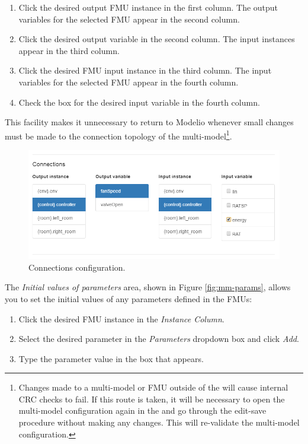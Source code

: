 \begin{enumerate}
  \item Click the desired output FMU instance in the first column.  The output variables for the selected FMU appear in the second column.
  \item Click the desired output variable in the second column.  The input instances appear in the third column.
  \item Click the desired FMU input instance in the third column.  The input variables for the selected FMU appear in the fourth column.
  \item Check the box for the desired input variable in the fourth column.
\end{enumerate}
%
%
%
This facility makes it unnecessary to return to Modelio whenever small changes must be made to the connection topology of the multi-model\footnote{Changes made to a multi-model or FMU outside of the \intoapp{} will cause internal CRC checks to fail.  If this route is taken, it will be necessary to open the multi-model configuration again in the \intoapp{} and go through the edit-save procedure without making any changes.  This will re-validate the multi-model configuration.}.
%
%
%
\begin{figure}[h!]
\centering
\includegraphics[width=\textwidth]{./figures/app/mm-conns}
\caption{Connections configuration.}
\label{fig:mm-conns}
\end{figure}
%
%
%
The \textit{Initial values of parameters} area, shown in
Figure \ref{fig:mm-params}, allows you to set the initial values of any parameters
defined in the FMUs:
%
%
%
\begin{enumerate}
  \item Click the desired FMU instance in the \textit{Instance Column}.
  \item Select the desired parameter in the \textit{Parameters} dropdown box and click \textit{Add}.
      \item Type the parameter value in the box that appears.
\end{enumerate}
